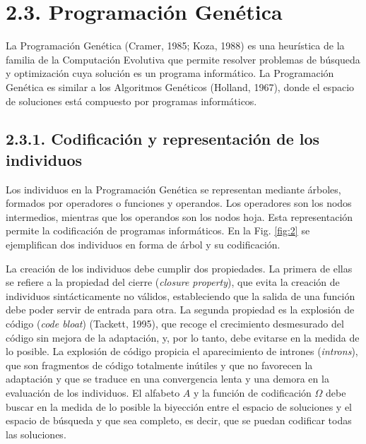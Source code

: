 \documentclass[spanish,a4paper,12pt,twoside]{report}
\begin{document}
  \section*{\Large 2.3. Programación Genética}
  La Programación Genética (Cramer, 1985; Koza, 1988) es una heurística de la familia de la Computación Evolutiva que permite resolver problemas de búsqueda y optimización cuya solución es un programa informático. La Programación Genética es similar a los Algoritmos Genéticos (Holland, 1967), donde el espacio de soluciones está compuesto por programas informáticos.
    \subsection*{\large 2.3.1. Codificación y representación de los individuos}
    Los individuos en la Programación Genética se representan mediante árboles, formados por operadores o funciones y operandos. Los operadores son los nodos intermedios, mientras que los operandos son los nodos hoja. Esta representación permite la codificación de programas informáticos. En la Fig. \ref{fig:2} se ejemplifican dos individuos en forma de árbol y su codificación. \par
    La creación de los individuos debe cumplir dos propiedades. La primera de ellas se refiere a la propiedad del cierre (\emph{closure property}), que evita la creación de individuos sintácticamente no válidos, estableciendo que la salida de una función debe poder servir de entrada para otra. La segunda propiedad es la explosión de código (\emph{code bloat}) (Tackett, 1995), que recoge el crecimiento desmesurado del código sin mejora de la adaptación, y, por lo tanto, debe evitarse en la medida de lo posible. La explosión de código propicia el aparecimiento de intrones (\emph{introns}), que son fragmentos de código totalmente inútiles y que no favorecen la adaptación y que se traduce en una convergencia lenta y una demora en la evaluación de los individuos. El alfabeto $A$ y la función de codificación $\Omega$ debe buscar en la medida de lo posible la biyección entre el espacio de soluciones y el espacio de búsqueda y que sea completo, es decir, que se puedan codificar todas las soluciones. \par
\end{document}
